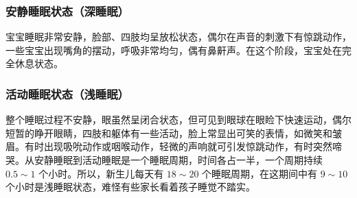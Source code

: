\subsubsection{安静睡眠状态（深睡眠）}

宝宝睡眠非常安静，脸部、四肢均呈放松状态，偶尔在声音的刺激下有惊跳动作，一些宝宝出现嘴角的摆动，呼吸非常均匀，偶有鼻鼾声。在这个阶段，宝宝处在完全休息状态。

\subsubsection{活动睡眠状态（浅睡眠）}

整个睡眠过程不安静，眼虽然呈闭合状态，但可见到眼球在眼睑下快速运动，偶尔短暂的睁开眼睛，四肢和躯体有一些活动，脸上常显出可笑的表情，如微笑和皱眉。有时出现吸吮动作或咽喉动作，轻微的声响就可引发惊跳动作，有时突然啼哭。从安静睡眠到活动睡眠是一个睡眠周期，时间各占一半，一个周期持续%
$0.5\sim{}1$%
个小时。所以，新生儿每天有%
$18\sim{}20$%
个睡眠周期，在这期间中有%
$9\sim{}10$
个小时是浅睡眠状态，难怪有些家长看着孩子睡觉不踏实。

